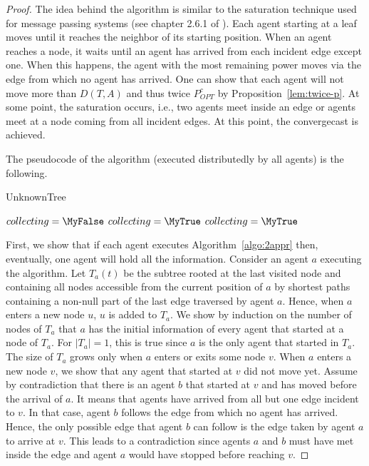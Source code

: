 \documentclass{article}
\begin{document}
\begin{proof}
The idea behind the algorithm is similar to the saturation technique used for message passing systems (see chapter 2.6.1 of \cite{San}). Each agent starting at a leaf moves until it reaches the neighbor of its starting position. When an agent reaches a node, it waits until an agent has arrived from each incident edge except one. When this happens, the agent with the most remaining power moves via the edge from which no agent has arrived. One can show that each agent will not move more than $D(T,A)$ and thus twice $P_{OPT}^c$ by Proposition~\ref{lem:twice-p}. At some point, the saturation occurs, i.e., two agents meet inside an edge or agents meet at a node coming from all incident edges. At this point, the convergecast is achieved.

The pseudocode of the algorithm (executed distributedly by all agents) is the following.

\begin{algorithm}[H]
\caption{UnknownTree \label{algo:2appr}}
 $collecting=\MyFalse$\;
 {\;
	{$collecting=\MyTrue$}
	{\;
	}
	\lElse
	{$collecting=\MyTrue$} 
 }
\end{algorithm}


 First, we show that if each agent executes Algorithm~\ref{algo:2appr} then, eventually, one agent will hold all the information. Consider an agent $a$ executing the algorithm. Let $T_a(t)$ be the subtree rooted at the last visited node and containing all nodes accessible from the current position of $a$ by shortest paths containing a non-null part of the last edge traversed by agent $a$. Hence, when $a$ enters a new node $u$, $u$ is added to $T_a$. We show by induction on the number of nodes of $T_a$ that $a$ has the initial information of every agent that started at a node of $T_a$. For $|T_a|=1$, this is true since $a$ is the only agent that started in $T_a$. The size of $T_a$ grows only when $a$ enters or exits some node $v$. When $a$ enters a new node $v$, we show that any agent that started at $v$ did not move yet. Assume by contradiction that there is an agent $b$ that started at $v$ and has moved before the arrival of $a$. It means that agents have arrived from all but one edge incident to $v$. In that case, agent $b$ follows the edge from which no agent has arrived. Hence, the only possible edge that agent $b$ can follow is the edge taken by agent $a$ to arrive at $v$. This leads to a contradiction since agents $a$ and $b$ must have met inside the edge and agent $a$ would have stopped before reaching $v$.
 

\end{proof}
\end{document}
